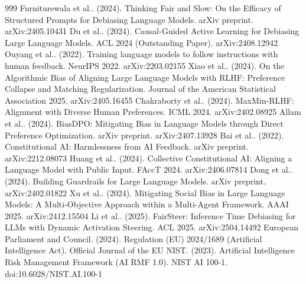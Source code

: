 \documentclass[10pt]{article}
\begin{document}
\begin{thebibliography}{999}
 Furniturewala et al.. (2024). Thinking Fair and Slow: On the Efficacy of Structured Prompts for Debiasing Language Models. arXiv preprint. arXiv:2405.10431
 Du et al.. (2024). Causal-Guided Active Learning for Debiasing Large Language Models. ACL 2024 (Outstanding Paper). arXiv:2408.12942
 Ouyang et al.. (2022). Training language models to follow instructions with human feedback. NeurIPS 2022. arXiv:2203.02155
 Xiao et al.. (2024). On the Algorithmic Bias of Aligning Large Language Models with RLHF: Preference Collapse and Matching Regularization. Journal of the American Statistical Association 2025. arXiv:2405.16455
 Chakraborty et al.. (2024). MaxMin-RLHF: Alignment with Diverse Human Preferences. ICML 2024. arXiv:2402.08925
 Allam et al.. (2024). BiasDPO: Mitigating Bias in Language Models through Direct Preference Optimization. arXiv preprint. arXiv:2407.13928
 Bai et al.. (2022). Constitutional AI: Harmlessness from AI Feedback. arXiv preprint. arXiv:2212.08073
 Huang et al.. (2024). Collective Constitutional AI: Aligning a Language Model with Public Input. FAccT 2024. arXiv:2406.07814
 Dong et al.. (2024). Building Guardrails for Large Language Models. arXiv preprint. arXiv:2402.01822
 Xu et al.. (2024). Mitigating Social Bias in Large Language Models: A Multi-Objective Approach within a Multi-Agent Framework. AAAI 2025. arXiv:2412.15504
 Li et al.. (2025). FairSteer: Inference Time Debiasing for LLMs with Dynamic Activation Steering. ACL 2025. arXiv:2504.14492
 European Parliament and Council. (2024). Regulation (EU) 2024/1689 (Artificial Intelligence Act). Official Journal of the EU
 NIST. (2023). Artificial Intelligence Risk Management Framework (AI RMF 1.0). NIST AI 100-1. doi:10.6028/NIST.AI.100-1
\end{thebibliography}
\end{document}
